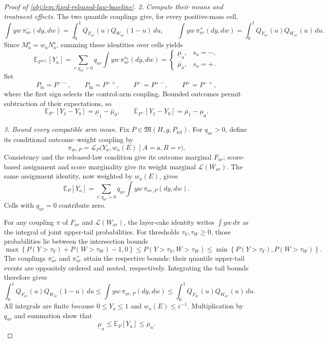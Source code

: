 \documentclass[11pt]{article}
\begin{document}
\begin{proof}[Proof of \cref{obj:lem:fixed-released-law-baseline}]
\noindent\emph{2. Compute their means and treatment effects.}
The two quantile couplings give, for every positive-mass cell,
\[
\int yw\,\pi_{ar}^{-}(dy,dw)
=\int_0^1 Q_{F_{ar}}(u)Q_{W_{ar}}(1-u)\,du,
\qquad
\int yw\,\pi_{ar}^{+}(dy,dw)
=\int_0^1 Q_{F_{ar}}(u)Q_{W_{ar}}(u)\,du.
\]
Since \(M_a^{s}=w_aN_a^{s}\), summing these identities over cells yields
\[
\mathbb E_{P^{s_0s_1}}[Y_a]
=\sum_{r:q_{ar}>0}q_{ar}\int yw\,\pi_{ar}^{s_a}(dy,dw)
=
\begin{cases}
\underline\mu_a,&s_a=-,\\
\overline\mu_a,&s_a=+.
\end{cases}
\]
Set
\[
P_{\mathrm{lo}}=P^{--},\qquad P_{\mathrm{hi}}=P^{++},
\qquad P^-=P^{+-},\qquad P^+=P^{-+},
\]
where the first sign selects the control-arm coupling. Bounded outcomes permit subtraction of their expectations, so
\begin{equation}\label{eq:fixed-law-ate-endpoints}
\mathbb E_{P^-}[Y_1-Y_0]=\underline\mu_1-\overline\mu_0,
\qquad
\mathbb E_{P^+}[Y_1-Y_0]=\overline\mu_1-\underline\mu_0.
\end{equation}

\noindent\emph{3. Bound every compatible arm mean.}
Fix \(P\in\mathfrak M(H,g,P_{\mathrm{rel}})\). For \(q_{ar}>0\), define its conditional outcome–weight coupling by
\[
\pi_{ar,P}
=\mathcal L_P\bigl(Y_a,w_a(E)\mid A=a,R=r\bigr).
\]
Consistency and the released-law condition give its outcome marginal \(F_{ar}\); score-based assignment and score marginality give its weight marginal \(\mathcal L(W_{ar})\). The same assignment identity, now weighted by \(w_a(E)\), gives
\[
\mathbb E_P[Y_a]
=\sum_{r:q_{ar}>0}q_{ar}\int yw\,\pi_{ar,P}(dy,dw).
\]
Cells with \(q_{ar}=0\) contribute zero.

For any coupling \(\pi\) of \(F_{ar}\) and \(\mathcal L(W_{ar})\), the layer-cake identity writes \(\int yw\,d\pi\) as the integral of joint upper-tail probabilities. For thresholds \(\tau_Y,\tau_W\ge0\), those probabilities lie between the intersection bounds
\[
\max\!\left\{P(Y>\tau_Y)+P(W>\tau_W)-1,0\right\}
\le P(Y>\tau_Y,W>\tau_W)
\le \min\!\left\{P(Y>\tau_Y),P(W>\tau_W)\right\}.
\]
The couplings \(\pi_{ar}^{-}\) and \(\pi_{ar}^{+}\) attain the respective bounds: their quantile upper-tail events are oppositely ordered and nested, respectively. Integrating the tail bounds therefore gives
\[
\int_0^1 Q_{F_{ar}}(u)Q_{W_{ar}}(1-u)\,du
\le \int yw\,\pi_{ar,P}(dy,dw)
\le \int_0^1 Q_{F_{ar}}(u)Q_{W_{ar}}(u)\,du.
\]
All integrals are finite because \(0\le Y_a\le1\) and \(w_a(E)\le\varepsilon^{-1}\). Multiplication by \(q_{ar}\) and summation show that
\begin{equation}\label{eq:fixed-law-arm-bound}
\underline\mu_a\le\mathbb E_P[Y_a]\le\overline\mu_a.
\end{equation}


\end{proof}
\end{document}

